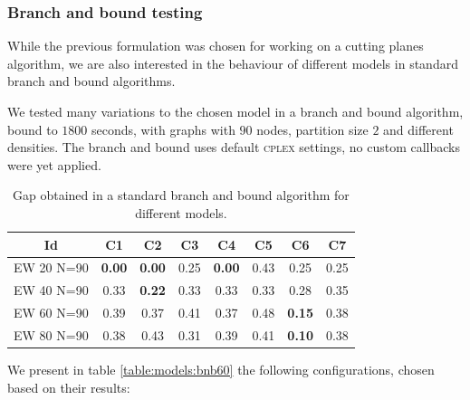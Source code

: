 \subsubsection{Branch and bound testing}

While the previous formulation was chosen for working on a cutting planes algorithm, we are also interested in the behaviour of different models in standard branch and bound algorithms. 

We tested many variations to the chosen model in a branch and bound algorithm, bound to $1800$ seconds, with graphs with $90$ nodes, partition size $2$ and different densities. The branch and bound uses default \textsc{cplex} settings, no custom callbacks were yet applied.

\begin{table}
\label{table:models:bnb}
\centering

\begin{tabular}{|c|c|c|c|c|c|c|c|}
\hline
\multicolumn{1}{|c|}{Id} & \multicolumn{1}{|c|}{C1} & \multicolumn{1}{|c|}{C2} & \multicolumn{1}{|c|}{C3}  & \multicolumn{1}{|c|}{C4} & \multicolumn{1}{|c|}{C5} & \multicolumn{1}{|c|}{C6} & \multicolumn{1}{|c|}{C7} 
\\
\hline
EW 20 N=90 & \textbf{0.00} & \textbf{0.00} & 0.25  & \textbf{0.00} & 0.43 & 0.25 & 0.25
\\
EW 40 N=90 & 0.33 & \textbf{0.22} & 0.33 & 0.33 & 0.33 & 0.28 & 0.35
\\
EW 60 N=90 & 0.39 & 0.37 & 0.41 & 0.37 & 0.48 & \textbf{0.15} & 0.38
\\
EW 80 N=90 & 0.38 & 0.43 & 0.31 & 0.39 & 0.41 & \textbf{0.10} & 0.38
\\
\hline 
 \end{tabular}

\caption{Gap obtained in a standard branch and bound algorithm for different models.}

\end{table}

We present in table \ref{table:models:bnb60} the following configurations, chosen based on their results:

\begin{itemize}
\end{itemize}

